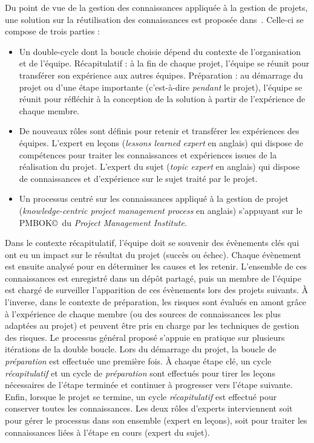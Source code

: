 \bigskip

Du point de vue de la gestion des connaissances appliquée à la gestion de projets, une solution sur la réutilisation des connaissances est proposée dans~\cite{schacht2016methodology}.
Celle-ci se compose de trois parties :

\begin{itemize}
\item Un double-cycle dont la boucle choisie dépend du contexte de l'organisation et de l'équipe.
Récapitulatif : à la fin de chaque projet, l'équipe se réunit pour transférer son expérience aux autres équipes.
Préparation : au démarrage du projet ou d'une étape importante (c'est-à-dire \textit{pendant} le projet), l'équipe se réunit pour réfléchir à la conception de la solution à partir de l'expérience de chaque membre.

\item De nouveaux rôles sont définis pour retenir et transférer les expériences des équipes.
L'expert en leçons (\textit{lessons learned expert} en anglais) qui dispose de compétences pour traiter les connaissances et expériences issues de la réalisation du projet.
L'expert du sujet (\textit{topic expert} en anglais) qui dispose de connaissances et d'expérience sur le sujet traité par le projet.

\item Un processus centré sur les connaissances appliqué à la gestion de projet (\textit{knowledge-centric project management process} en anglais) s'appuyant sur le PMBOK\copyright ~du \textit{Project Management Institute}.
\end{itemize}

Dans le contexte récapitulatif, l'équipe doit se souvenir des évènements clés qui ont eu un impact sur le résultat du projet (succès ou échec).
Chaque évènement est ensuite analysé pour en déterminer les causes et les retenir.
L'ensemble de ces connaissances est enregistré dans un dépôt partagé, puis un membre de l'équipe est chargé de surveiller l'apparition de ces évènements lors des projets suivants.
À l'inverse, dans le contexte de préparation, les risques sont évalués en amont grâce à l'expérience de chaque membre (ou des sources de connaissances les plus adaptées au projet) et peuvent être pris en charge par les techniques de gestion des risques.
Le processus général proposé s'appuie en pratique sur plusieurs itérations de la double boucle.
Lors du démarrage du projet, la boucle de \textit{préparation} est effectuée une première fois.
À chaque étape clé, un cycle \textit{récapitulatif} et un cycle de \textit{préparation} sont effectués pour tirer les leçons nécessaires de l'étape terminée et continuer à progresser vers l'étape suivante.
Enfin, lorsque le projet se termine, un cycle \textit{récapitulatif} est effectué pour conserver toutes les connaissances.
Les deux rôles d'experts interviennent soit pour gérer le processus dans son ensemble (expert en leçons), soit pour traiter les connaissances liées à l'étape en cours (expert du sujet).

